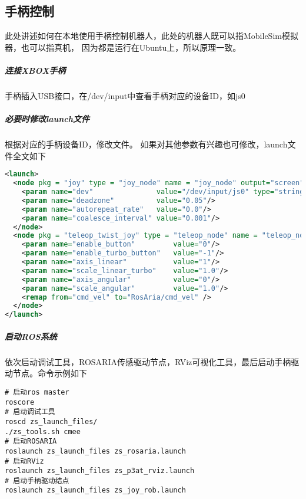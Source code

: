 \documentclass[a4paper,twoside,cs4size,fancyhdr,notitlepage]{ctexart}
\begin{document}
\subsection{手柄控制}
此处讲述如何在本地使用手柄控制机器人，此处的机器人既可以指MobileSim模拟器，也可以指真机，
因为都是运行在Ubuntu上，所以原理一致。
\subparagraph{连接XBOX手柄}
手柄插入USB接口，在/dev/input中查看手柄对应的设备ID，如js0
\subparagraph{必要时修改launch文件}
根据对应的手柄设备ID，修改文件。
如果对其他参数有兴趣也可修改，launch文件全文如下
\begin{lstlisting}[language=xml]
<launch>
  <node pkg = "joy" type = "joy_node" name = "joy_node" output="screen">
    <param name="dev" 			    value="/dev/input/js0" type="string"/>
    <param name="deadzone" 		    value="0.05"/>
    <param name="autorepeat_rate"   value="0.0"/>
    <param name="coalesce_interval" value="0.001"/>
  </node>
  <node pkg = "teleop_twist_joy" type = "teleop_node" name = "teleop_node" output="screen">
    <param name="enable_button"         value="0"/>
    <param name="enable_turbo_button"   value="-1"/>
    <param name="axis_linear"           value="1"/>
    <param name="scale_linear_turbo"    value="1.0"/>
    <param name="axis_angular"          value="0"/>
    <param name="scale_angular"         value="1.0"/>
    <remap from="cmd_vel" to="RosAria/cmd_vel" />
  </node>
</launch>
\end{lstlisting}
\subparagraph{启动ROS系统}
依次启动调试工具，ROSARIA传感驱动节点，RViz可视化工具，最后启动手柄驱动节点。命令示例如下
\begin{lstlisting}
# 启动ros master
roscore
# 启动调试工具
roscd zs_launch_files/
./zs_tools.sh cmee
# 启动ROSARIA
roslaunch zs_launch_files zs_rosaria.launch
# 启动RViz
roslaunch zs_launch_files zs_p3at_rviz.launch
# 启动手柄驱动结点
roslaunch zs_launch_files zs_joy_rob.launch
\end{lstlisting}
\end{document}
